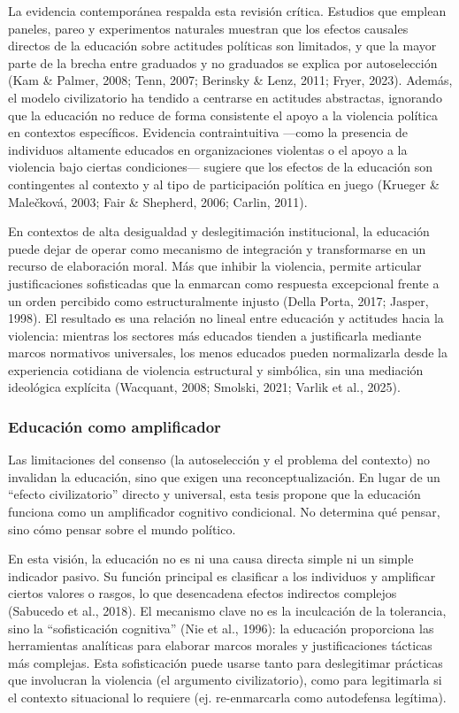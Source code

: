 \documentclass[
  13pt,
]{article}
\begin{document}
La evidencia contemporánea respalda esta revisión crítica. Estudios que
emplean paneles, pareo y experimentos naturales muestran que los efectos
causales directos de la educación sobre actitudes políticas son
limitados, y que la mayor parte de la brecha entre graduados y no
graduados se explica por autoselección (Kam \& Palmer, 2008; Tenn, 2007;
Berinsky \& Lenz, 2011; Fryer, 2023). Además, el modelo civilizatorio ha
tendido a centrarse en actitudes abstractas, ignorando que la educación
no reduce de forma consistente el apoyo a la violencia política en
contextos específicos. Evidencia contraintuitiva ---como la presencia de
individuos altamente educados en organizaciones violentas o el apoyo a
la violencia bajo ciertas condiciones--- sugiere que los efectos de la
educación son contingentes al contexto y al tipo de participación
política en juego (Krueger \& Malečková, 2003; Fair \& Shepherd, 2006;
Carlin, 2011).

En contextos de alta desigualdad y deslegitimación institucional, la
educación puede dejar de operar como mecanismo de integración y
transformarse en un recurso de elaboración moral. Más que inhibir la
violencia, permite articular justificaciones sofisticadas que la
enmarcan como respuesta excepcional frente a un orden percibido como
estructuralmente injusto (Della Porta, 2017; Jasper, 1998). El resultado
es una relación no lineal entre educación y actitudes hacia la
violencia: mientras los sectores más educados tienden a justificarla
mediante marcos normativos universales, los menos educados pueden
normalizarla desde la experiencia cotidiana de violencia estructural y
simbólica, sin una mediación ideológica explícita (Wacquant, 2008;
Smolski, 2021; Varlik et al., 2025).

\subsubsection{Educación como
amplificador}\label{educaciuxf3n-como-amplificador}

Las limitaciones del consenso (la autoselección y el problema del
contexto) no invalidan la educación, sino que exigen una
reconceptualización. En lugar de un ``efecto civilizatorio'' directo y
universal, esta tesis propone que la educación funciona como un
amplificador cognitivo condicional. No determina qué pensar, sino cómo
pensar sobre el mundo político.

En esta visión, la educación no es ni una causa directa simple ni un
simple indicador pasivo. Su función principal es clasificar a los
individuos y amplificar ciertos valores o rasgos, lo que desencadena
efectos indirectos complejos (Sabucedo et al., 2018). El mecanismo clave
no es la inculcación de la tolerancia, sino la ``sofisticación
cognitiva'' (Nie et al., 1996): la educación proporciona las
herramientas analíticas para elaborar marcos morales y justificaciones
tácticas más complejas. Esta sofisticación puede usarse tanto para
deslegitimar prácticas que involucran la violencia (el argumento
civilizatorio), como para legitimarla si el contexto situacional lo
requiere (ej. re-enmarcarla como autodefensa legítima).
\end{document}
